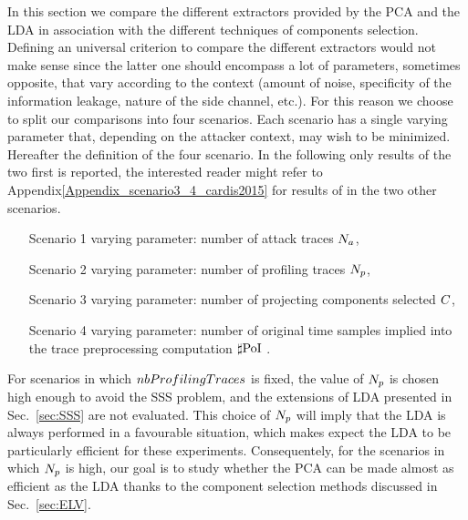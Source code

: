 In this section we compare the different extractors provided by the PCA and the LDA in association with the different techniques  of components selection. Defining an universal criterion to compare the different extractors would not make sense since the latter one should encompass a lot of parameters, sometimes opposite, that vary according to the context (amount of noise, specificity of the information leakage, nature of the side channel, etc.). For this reason we choose to split our comparisons into four scenarios. Each scenario has a single varying parameter that, depending on the attacker context, may wish to be minimized. Hereafter the definition of the four scenario. In the following only results of the two first is reported, the interested reader might refer to Appendix\ref{Appendix_scenario3_4_cardis2015} for results of in the two other scenarios.  
\begin{itemize}
\item[Scenario 1] varying parameter: number of attack traces $N_a$, 
\item[Scenario 2] varying parameter: number of profiling traces $N_p$, 
\item[Scenario 3] varying parameter: number of projecting components selected $C$,
\item[Scenario 4] varying parameter: number of original time samples implied into the trace preprocessing computation $\sharp\mathrm{PoI}$ .
\end{itemize}
 
For scenarios in which $\\nbProfilingTraces$ is fixed, the value of $N_p$ is chosen high enough to avoid the SSS problem, and the extensions of LDA presented in Sec.~\ref{sec:SSS} are not evaluated.
 This choice of $N_p$ will imply that the LDA is always performed in a favourable situation, which makes expect the LDA to be particularly efficient for these experiments. Consequentely, for the scenarios in which $N_p$ is high, our goal is to study whether the PCA can be made almost as efficient as the LDA thanks to the component selection methods discussed in Sec.~\ref{sec:ELV}. 



